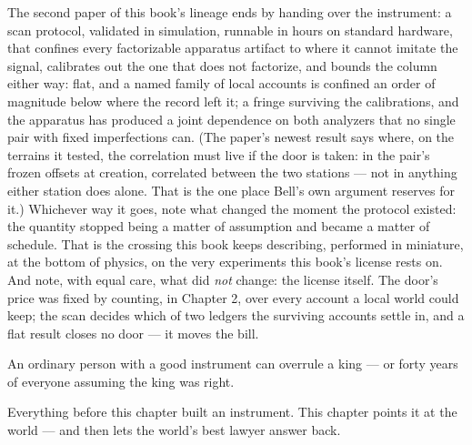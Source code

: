The second paper of this book's lineage ends by handing over the
instrument: a scan protocol, validated in simulation, runnable in
hours on standard hardware, that confines every factorizable apparatus
artifact to where it cannot imitate the signal, calibrates out the one
that does not factorize, and bounds the column either way: flat, and a
named family of local accounts is confined an order of magnitude below
where the record left it; a fringe surviving the calibrations, and the
apparatus has produced a joint dependence on both analyzers that no
single pair with fixed imperfections can. (The paper's newest result
says where, on the terrains it tested, the correlation must live if the
door is taken: in the pair's frozen offsets at creation, correlated
between the two stations --- not in anything either station does alone.
That is the one place Bell's own argument reserves for it.) Whichever way it goes, note
what changed the moment the protocol existed: the quantity stopped
being a matter of assumption and became a matter of schedule. That is
the crossing this book keeps describing, performed in miniature, at the
bottom of physics, on the very experiments this book's license rests
on. And note, with equal care, what did \emph{not} change: the license
itself. The door's price was fixed by counting, in Chapter 2, over
every account a local world could keep; the scan decides which of two
ledgers the surviving accounts settle in, and a flat result closes no
door --- it moves the bill.

An ordinary person with a good instrument can overrule a king --- or
forty years of everyone assuming the king was right.




Everything before this chapter built an instrument. This chapter
points it at the world --- and then lets the world's best lawyer answer
back.

